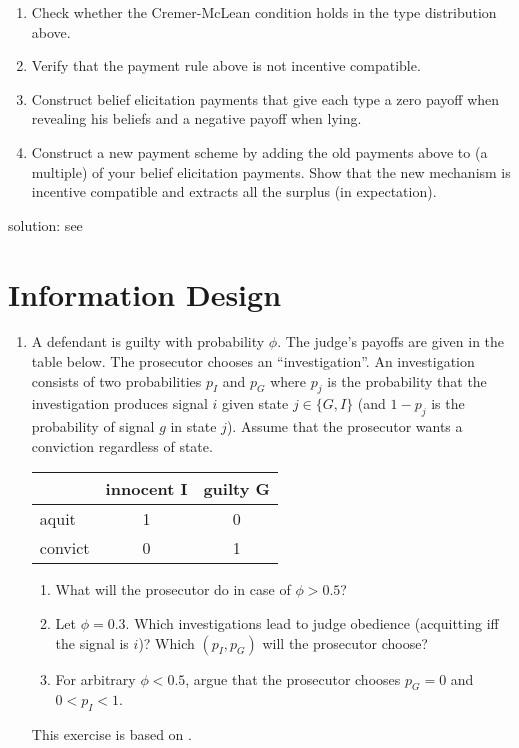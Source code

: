 \documentclass[a4paper,12pt]{article}
\begin{document}
\begin{enumerate}
\begin{enumerate}
\item Check whether the Cremer-McLean condition holds in the type distribution above.
\item Verify that the payment rule above is not incentive compatible.
\item Construct belief elicitation payments that give each type a zero payoff when revealing his beliefs and a negative payoff when lying.
\item Construct a new payment scheme by adding the old payments above to (a multiple) of your belief elicitation payments. Show that the new mechanism is incentive compatible and extracts all the surplus (in expectation).
\end{enumerate}

solution: see  \citet[p. 134--136]{boergers2015}
\end{enumerate}

\section{Information Design}
\label{sec:information-design}
\begin{enumerate}
\item A defendant is guilty with probability $\phi$. The judge's payoffs are given in the table below. The prosecutor chooses an ``investigation''. An investigation consists of two probabilities $p_I$ and $p_G$ where $p_j$ is the probability that the investigation produces signal $i$ given state $j\in\{G,I\}$ (and $1-p_j$ is the probability of signal $g$ in state $j$). Assume that the prosecutor wants a conviction regardless of state.
  
\begin{center}
\begin{tabular}{|l|c|c|}
\hline
 & innocent I & guilty G\\
\hline
aquit & 1 & 0\\
\hline
convict & 0 & 1\\
\hline
\end{tabular}
\end{center}
\begin{enumerate}
\item  What will the prosecutor do in case of $\phi>0.5$?
\item Let $\phi=0.3$. Which investigations lead to judge obedience (acquitting iff the signal is $i$)? Which $(p_I,p_G)$ will the prosecutor choose?
\item For arbitrary $\phi<0.5$, argue that the prosecutor chooses $p_G=0$ and $0<p_I<1$. 
\end{enumerate}
This exercise is based on \cite{kamenica11_bayes_persuas}. 
\end{enumerate}
\end{document}
